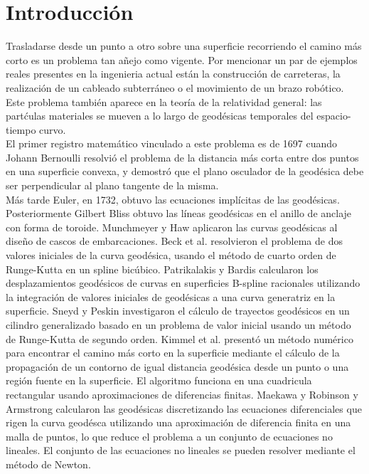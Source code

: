 \documentclass{endm}
\begin{document}
\tableofcontents
\clearpage
%
\section{Introducci\'on}\label{intro}
 Trasladarse desde un punto a otro sobre una superficie recorriendo el camino m\'as corto es un problema tan a\~nejo como vigente. Por mencionar un par de ejemplos reales presentes en la ingenieria actual est\'an la construcci\'on de carreteras, la realizaci\'on de un cableado subterr\'aneo o el movimiento de un brazo rob\'otico. Este problema tambi\'en aparece en la teor\'ia de la relatividad general: las part\'culas materiales se mueven a lo largo de geod\'esicas temporales del espacio-tiempo curvo. \\
El primer registro matem\'atico vinculado a este problema es de 1697 cuando Johann Bernoulli resolvi\'o  el problema de la distancia m\'as corta entre dos puntos en una superficie convexa, y demostr\'o que el plano osculador de la geod\'esica debe ser perpendicular al plano tangente de la misma. \\
M\'as tarde Euler, en 1732, obtuvo las ecuaciones impl\'icitas de las geod\'esicas.\\
Posteriormente Gilbert Bliss obtuvo las l\'ineas geod\'esicas en el anillo de anclaje con forma de toroide. 
Munchmeyer y Haw aplicaron las curvas geod\'esicas al dise\~no de cascos de embarcaciones.
Beck et al. resolvieron el problema de dos valores iniciales de la curva geod\'esica, usando el m\'etodo de cuarto orden de Runge-Kutta en un spline bic\'ubico. Patrikalakis y Bardis calcularon los desplazamientos geod\'esicos de curvas en superficies B-spline racionales utilizando la integraci\'on de valores iniciales de geod\'esicas a una curva generatriz  en la superficie.
Sneyd y Peskin investigaron el c\'alculo de trayectos geod\'esicos en un cilindro generalizado basado en un problema de valor inicial usando un m\'etodo de Runge-Kutta de segundo orden.
Kimmel et al. present\'o un m\'etodo num\'erico para encontrar el camino m\'as corto en la superficie mediante el c\'alculo de la propagaci\'on de un contorno de igual distancia geod\'esica desde un punto o una regi\'on fuente en la superficie. El algoritmo funciona en una cuadricula rectangular usando aproximaciones de diferencias finitas.
Maekawa y Robinson y Armstrong calcularon las geod\'esicas discretizando las ecuaciones diferenciales que rigen la curva geod\'esca utilizando una aproximaci\'on de diferencia finita en una malla de puntos, lo que reduce el problema a un conjunto de ecuaciones no lineales. El conjunto de las ecuaciones no lineales se pueden resolver mediante el m\'etodo de Newton.
\end{document}
